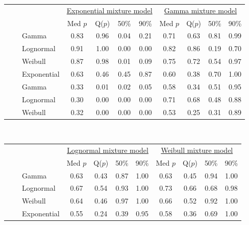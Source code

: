 \documentclass[useAMS,usenatbib,referee,12pt]{article}
\begin{document}
\begin{table}[ht]
\begin{tabular}{l|l|l|cccc|cccc}
 \multicolumn{3}{c}{ } & \multicolumn{4}{c}{\underline{Exponential mixture model}} & \multicolumn{4}{c}{\underline{Gamma mixture model}} \\
 \multicolumn{3}{c}{ } & Med $p$ & Q($p$) & 50\% & 90\%  & Med $p$ & Q($p$) & 50\% & 90\% \\ 
  \hline
\parbox[t]{2mm}{} & \parbox[t]{2mm}{} & Gamma & 0.83 & 0.96 & 0.04 & 0.21 & 0.71 & 0.63 & 0.81 & 0.99 \\ 
   &  & Lognormal & 0.91 & 1.00 & 0.00 & 0.00 & 0.82 & 0.86 & 0.19 & 0.70 \\ 
   &  & Weibull & 0.87 & 0.98 & 0.01 & 0.09 & 0.75 & 0.72 & 0.54 & 0.97 \\ 
   &  & Exponential & 0.63 & 0.46 & 0.45 & 0.87 & 0.60 & 0.38 & 0.70 & 1.00 \\ 
& \parbox[t]{2mm}{} & Gamma & 0.33 & 0.01 & 0.02 & 0.05 & 0.58 & 0.34 & 0.51 & 0.95 \\ 
   &  & Lognormal & 0.30 & 0.00 & 0.00 & 0.00 & 0.71 & 0.68 & 0.48 & 0.88 \\ 
   &  & Weibull & 0.32 & 0.00 & 0.00 & 0.00 & 0.53 & 0.25 & 0.31 & 0.89 \\ 
   \hline
\end{tabular}
\vspace{0.5cm}\\
\begin{tabular}{l|l|l|cccc|cccc}
 \multicolumn{3}{c}{ } & \multicolumn{4}{c}{\underline{Lognormal mixture model}} & \multicolumn{4}{c}{\underline{Weibull mixture model}} \\
 \multicolumn{3}{c}{ } & Med $p$ & Q($p$) & 50\% & 90\% & Med $p$ & Q($p$) & 50\% & 90\% \\ 
  \hline
\parbox[t]{2mm}{} & \parbox[t]{2mm}{} & Gamma & 0.63 & 0.43 & 0.87 & 1.00 & 0.63 & 0.45 & 0.94 & 1.00 \\ 
   &  & Lognormal & 0.67 & 0.54 & 0.93 & 1.00 & 0.73 & 0.66 & 0.68 & 0.98 \\ 
   &  & Weibull & 0.64 & 0.46 & 0.97 & 1.00 & 0.66 & 0.52 & 0.92 & 1.00 \\ 
   &  & Exponential & 0.55 & 0.24 & 0.39 & 0.95 & 0.58 & 0.36 & 0.69 & 1.00 \\ 

\end{tabular}
\end{table}
\end{document}
